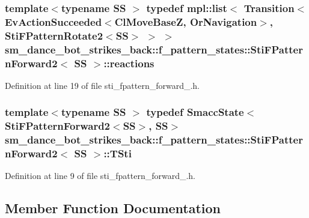 \subsubsection[{\texorpdfstring{reactions}{reactions}}]{\setlength{\rightskip}{0pt plus 5cm}template$<$typename SS $>$ typedef mpl\+::list$<$ Transition$<$Ev\+Action\+Succeeded$<${\bf Cl\+Move\+BaseZ}, {\bf Or\+Navigation}$>$, {\bf Sti\+F\+Pattern\+Rotate2}$<$SS$>$ $>$ $>$ {\bf sm\+\_\+dance\+\_\+bot\+\_\+strikes\+\_\+back\+::f\+\_\+pattern\+\_\+states\+::\+Sti\+F\+Pattern\+Forward2}$<$ SS $>$\+::{\bf reactions}}\hypertarget{structsm__dance__bot__strikes__back_1_1f__pattern__states_1_1StiFPatternForward2_a4b666bddbb8b37f7bb03616092defb3e}{}\label{structsm__dance__bot__strikes__back_1_1f__pattern__states_1_1StiFPatternForward2_a4b666bddbb8b37f7bb03616092defb3e}


Definition at line 19 of file sti\+\_\+fpattern\+\_\+forward\+\_.\+h.

\subsubsection[{\texorpdfstring{T\+Sti}{TSti}}]{\setlength{\rightskip}{0pt plus 5cm}template$<$typename SS $>$ typedef {\bf Smacc\+State}$<${\bf Sti\+F\+Pattern\+Forward2}$<$SS$>$, SS$>$ {\bf sm\+\_\+dance\+\_\+bot\+\_\+strikes\+\_\+back\+::f\+\_\+pattern\+\_\+states\+::\+Sti\+F\+Pattern\+Forward2}$<$ SS $>$\+::{\bf T\+Sti}}\hypertarget{structsm__dance__bot__strikes__back_1_1f__pattern__states_1_1StiFPatternForward2_a2476b4df7abc75dd9bb750a71a9df158}{}\label{structsm__dance__bot__strikes__back_1_1f__pattern__states_1_1StiFPatternForward2_a2476b4df7abc75dd9bb750a71a9df158}


Definition at line 9 of file sti\+\_\+fpattern\+\_\+forward\+\_.\+h.



\subsection{Member Function Documentation}
